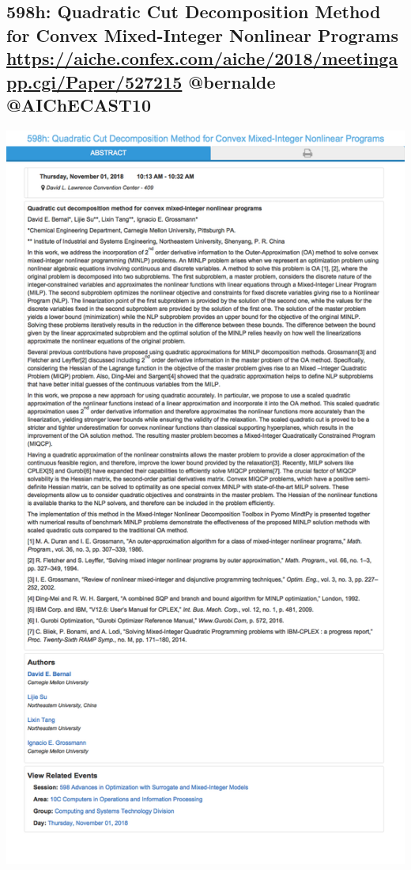 \documentclass[11pt]{article}
\begin{document}
\subsection{598h: Quadratic Cut Decomposition Method for Convex Mixed-Integer Nonlinear Programs \url{https://aiche.confex.com/aiche/2018/meetingapp.cgi/Paper/527215} @bernalde @AIChECAST10}
\label{sec:orgddbe942}
\begin{center}
\includegraphics[width=.9\linewidth]{./527215.png}
\end{center}
\end{document}
